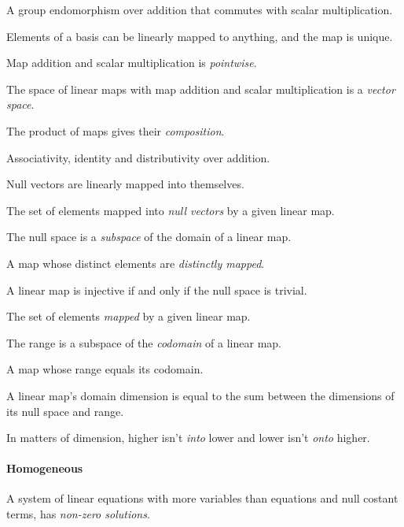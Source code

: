 \begin{multicols}{3}
  A group endomorphism over addition that commutes with scalar multiplication.

  Elements of a basis can be linearly mapped to anything, and the map is unique.

  Map addition and scalar multiplication is \textit{pointwise}.
  
  The space of linear maps with map addition and scalar multiplication is a \textit{vector space}.

  The product of maps gives their \textit{composition}.

  Associativity, identity and distributivity over addition.

  Null vectors are linearly mapped into themselves.

  The set of elements mapped into \textit{null vectors} by a given linear map.

  The null space is a \textit{subspace} of the domain of a linear map.

  A map whose distinct elements are \textit{distinctly mapped}.

  A linear map is injective if and only if the null space is trivial.

  The set of elements \textit{mapped} by a given linear map.

  The range is a subspace of the \textit{codomain} of a linear map.

  A map whose range equals its codomain.

  A linear map's domain dimension is equal to the sum between the dimensions of its null space and range.

  In matters of dimension, higher isn't \textit{into} lower and lower isn't \textit{onto} higher.

  \paragraph{\textbf{Homogeneous}}
  A system of linear equations with more variables than equations and null costant terms, has \textit{non-zero solutions}.
  

\end{multicols}
